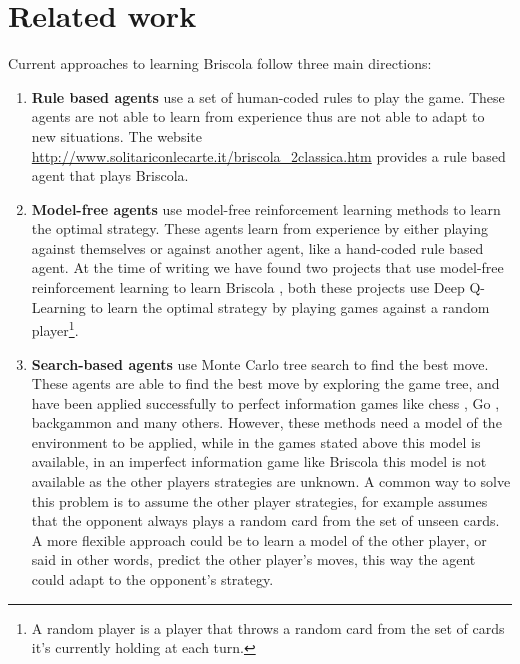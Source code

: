 \section{Related work}
Current approaches to learning Briscola follow three main directions:
\begin{enumerate}
    \item \textbf{Rule based agents} use a set of human-coded rules to play the game. These agents are not able to learn from experience thus are not able to adapt to new situations. The website \url{http://www.solitariconlecarte.it/briscola_2classica.htm} provides a rule based agent that plays Briscola.
    \item \textbf{Model-free agents} use model-free reinforcement learning methods to learn the optimal strategy. These agents learn from experience by either playing against themselves or against another agent, like a hand-coded rule based agent. At the time of writing we have found two projects that use model-free reinforcement learning to learn Briscola \cite{fezriva-briscola-dqn, alsora-deep-briscola-dqn}, both these projects use Deep Q-Learning \cite{mnih2013playing} to learn the optimal strategy by playing games against a random player\footnote[1]{A random player is a player that throws a random card from the set of cards it's currently holding at each turn.}.
    \item \textbf{Search-based agents} use Monte Carlo tree search to find the best move. These agents are able to find the best move by exploring the game tree, and have been applied successfully to perfect information games like chess \cite{alphazero}, Go \cite{alphagozero}, backgammon \cite{td-gammon} and many others. However, these methods need a model of the environment to be applied, while in the games stated above this model is available, in an imperfect information game like Briscola this model is not available as the other players strategies are unknown. A common way to solve this problem is to assume the other player strategies, for example \cite{Briscola-mcts-Playing-Algorithm} assumes that the opponent always plays a random card from the set of unseen cards. A more flexible approach could be to learn a model of the other player, or said in other words, predict the other player's moves, this way the agent could adapt to the opponent's strategy.
\end{enumerate}
